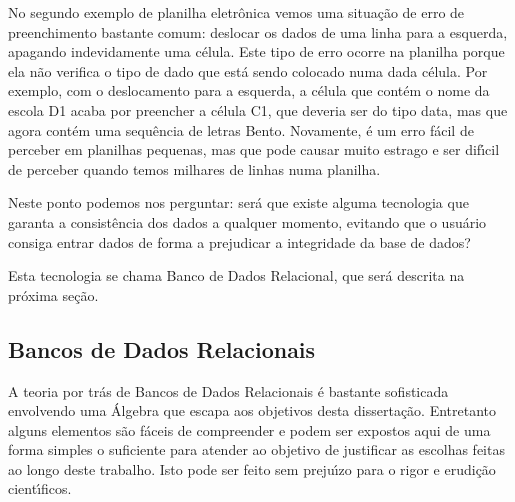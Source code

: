 \documentclass[
12pt,		%
openright,	%
twoside,  %
a4paper,			%
chapter=TITLE,		%
english,			%
french,				%
spanish,			%
brazil				%
]{USPSC-classe/USPSC}
\begin{document}
No segundo exemplo de planilha eletr\^onica vemos uma situa\c{c}\~ao de erro de preenchimento bastante comum: deslocar os dados de uma linha para a esquerda, apagando indevidamente uma c\'elula. Este tipo de erro ocorre na planilha porque ela n\~ao verifica o tipo de dado que est\'a sendo colocado numa dada c\'elula. Por exemplo, com o deslocamento para a esquerda, a c\'elula que cont\'em o nome da escola D1 acaba por preencher a c\'elula C1, que deveria ser do tipo data, mas que agora cont\'em uma sequ\^encia de letras \textquotedbl Bento\textquotedbl . Novamente, \'e um erro f\'acil de perceber em planilhas pequenas, mas que pode causar muito estrago e ser dif\'{\i}cil de perceber quando temos milhares de linhas numa planilha.










Neste ponto podemos nos perguntar: ser\'a que existe alguma tecnologia que garanta a consist\^encia dos dados a qualquer momento, evitando que o usu\'ario consiga entrar dados de forma a prejudicar a integridade da base de dados?










Esta tecnologia se chama \textquotedbl Banco de Dados Relacional\textquotedbl , que ser\'a descrita na pr\'oxima se\c{c}\~ao.










\subsection[Bancos de Dados Relacionais]{Bancos de Dados Relacionais}\label{Bancos de Dados Relacionais}
A teoria por tr\'as de Bancos de Dados Relacionais \'e bastante sofisticada envolvendo uma \'Algebra que escapa aos objetivos desta disserta\c{c}\~ao. Entretanto alguns elementos s\~ao f\'aceis de compreender e podem ser expostos aqui de uma forma simples o suficiente para atender ao objetivo de justificar as escolhas feitas ao longo deste trabalho. Isto pode ser feito sem preju\'{\i}zo para o rigor e erudi\c{c}\~ao cient\'{\i}ficos.
\end{document}
